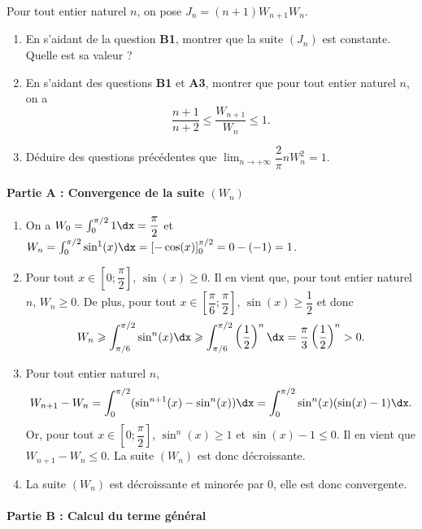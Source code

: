 \documentclass[11pt,fleqn, openany]{book} %
\begin{document}
\begin{exercise}[topic=trig03, subtitle={(Intégrales de Wallis)}]
Pour tout entier naturel $n$, on pose $J_n=(n+1)W_{n+1}W_n$.
\begin{enumerate}
\item En s'aidant de la question \textbf{B1}, montrer que la suite $(J_n)$ est constante. Quelle est sa valeur ?
\item En s'aidant des questions \textbf{B1} et \textbf{A3}, montrer que pour tout entier naturel $n$, on a
\[\dfrac{n+1}{n+2} \leqslant \dfrac{W_{n+1}}{W_n}\leqslant 1.\]
\item Déduire des questions précédentes que $\displaystyle\lim_{n \to + \infty} \dfrac{2}{\pi}n W_n^2=1$.
\end{enumerate}


\end{exercise}

\begin{solution}


\paragraph{Partie A : Convergence de la suite $(W_n)$}

\begin{enumerate}
\item On a $W_0 = \int_0^{\pi/2} 1 \dx = \dfrac{\pi}{2}$ et $W_n = \int_0^{\pi/2} \sin^1(x) \dx=[-\cos(x)]_0^{\pi/2}=0-(-1)=1$.
\item Pour tout $x\in \left[0;\dfrac{\pi}{2}\right]$, $\sin(x)\geqslant 0$. Il en vient que, pour tout entier naturel $n$, $W_n\geqslant 0$. De plus, pour tout $x \in \left[\dfrac{\pi}{6};\dfrac{\pi}{2}\right]$, $\sin(x)\geqslant \dfrac{1}{2}$ et donc 
\[W_n \geqslant \int_{\pi/6}^{\pi/2} \sin^n(x) \dx \geqslant \int_{\pi/6}^{\pi/2} \left(\dfrac{1}{2}\right)^n \dx = \dfrac{\pi}{3}\left(\dfrac{1}{2}\right)^n >0.\]
\item Pour tout entier naturel $n$,
\[W_{n+1}-W_n=\int_0^{\pi/2} (\sin^{n+1}(x)-\sin^n(x)) \dx = \int_0^{\pi/2} \sin^n(x)(\sin(x)-1) \dx .\]
Or, pour tout $x\in  \left[0;\dfrac{\pi}{2}\right]$, $\sin^n(x)\geqslant 1$ et $\sin(x)-1 \leqslant 0$. Il en vient que $W_{n+1}-W_n \leqslant 0$. La suite $(W_n)$ est donc décroissante.
\item La suite $(W_n)$ est décroissante et minorée par 0, elle est donc convergente.
\end{enumerate}

\paragraph{Partie B : Calcul du terme général}


\end{solution}
\end{document}
